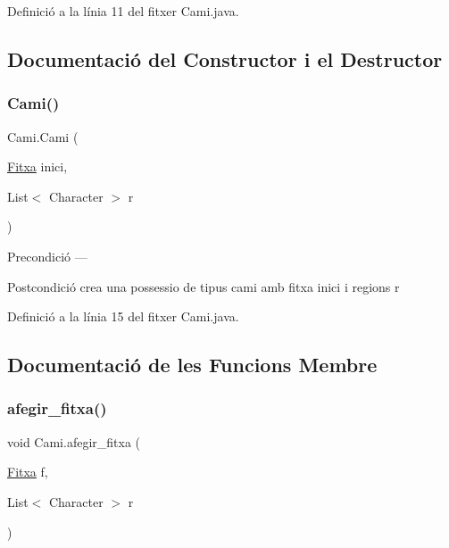 Definició a la línia 11 del fitxer Cami.\+java.



\subsection{Documentació del Constructor i el Destructor}
\mbox{\label{class_cami_a212b05de3f803472fb27fd121c2fa674}} 
\subsubsection{\texorpdfstring{Cami()}{Cami()}}
{\footnotesize\ttfamily Cami.\+Cami (\begin{DoxyParamCaption}\item[{\mbox{\hyperlink{class_fitxa}{Fitxa}}}]{inici,  }\item[{List$<$ Character $>$}]{r }\end{DoxyParamCaption})}

\begin{DoxyPrecond}{Precondició}
--- 
\end{DoxyPrecond}
\begin{DoxyPostcond}{Postcondició}
crea una possessio de tipus cami amb fitxa inici i regions r 
\end{DoxyPostcond}


Definició a la línia 15 del fitxer Cami.\+java.



\subsection{Documentació de les Funcions Membre}
\mbox{\label{class_cami_abbc38e23b41d673e78f8f9e9fef0890b}} 
\subsubsection{\texorpdfstring{afegir\+\_\+fitxa()}{afegir\_fitxa()}}
{\footnotesize\ttfamily void Cami.\+afegir\+\_\+fitxa (\begin{DoxyParamCaption}\item[{\mbox{\hyperlink{class_fitxa}{Fitxa}}}]{f,  }\item[{List$<$ Character $>$}]{r }\end{DoxyParamCaption})}

